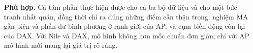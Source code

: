  \textbf{Phù hợp.} Cả tám phần thực hiện được cho cả ba bộ dữ liệu và cho một bức tranh nhất quán, đồng thời chỉ ra đúng những điểm cần thận trọng: nghiệm MA gần biên và phần dư bình phương ở ranh giới của AP, và cụm biến động còn lại của DAX. Với Nile và DAX, mô hình không hơn mốc chuẩn đơn giản; chỉ với AP mô hình mới mang lại giá trị rõ ràng.
